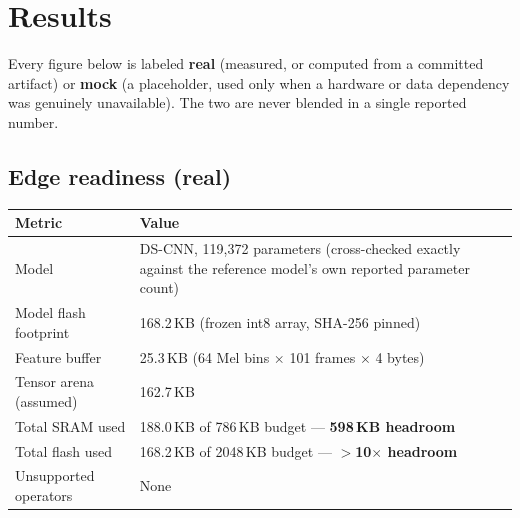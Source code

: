 \documentclass[11pt,a4paper]{article}
\begin{document}
\newpage
\section{Results}
\label{sec:results}

Every figure below is labeled \textbf{real} (measured, or computed from a
committed artifact) or \textbf{mock} (a placeholder, used only when a
hardware or data dependency was genuinely unavailable). The two are never
blended in a single reported number.

\subsection{Edge readiness (real)}
\begin{longtable}{@{}p{5.4cm}p{9.0cm}@{}}
\toprule
\textbf{Metric} & \textbf{Value} \\
\midrule
\endhead
Model & DS-CNN, 119{,}372 parameters (cross-checked exactly against the
  reference model's own reported parameter count) \\
Model flash footprint & 168.2\,KB (frozen int8 array, SHA-256 pinned) \\
Feature buffer & 25.3\,KB (64 Mel bins $\times$ 101 frames $\times$ 4 bytes) \\
Tensor arena (assumed) & 162.7\,KB \\
Total SRAM used & 188.0\,KB of 786\,KB budget --- \textbf{598\,KB headroom} \\
Total flash used & 168.2\,KB of 2048\,KB budget --- \textbf{$>$10$\times$ headroom} \\
Unsupported operators & None \\
\bottomrule
\end{longtable}
\end{document}
